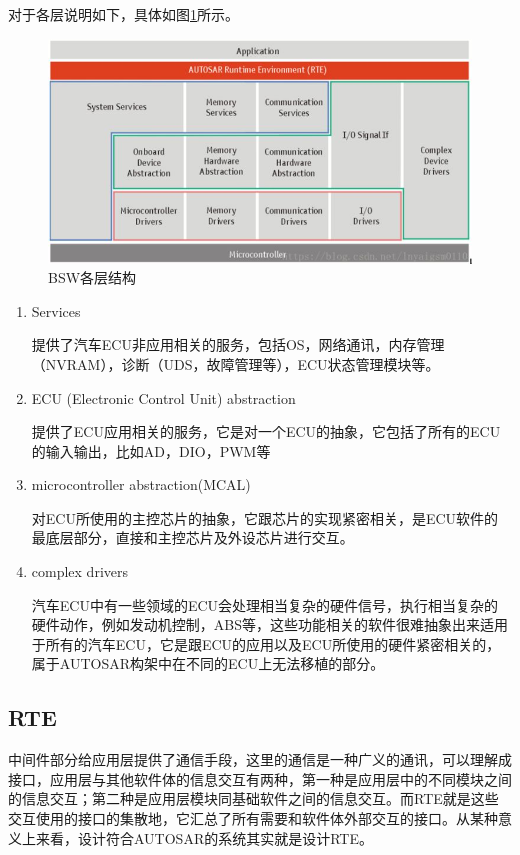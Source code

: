 对于各层说明如下，具体如图\ref{fig:bsw_struct_2}所示。
\begin{figure}[ht]
	\centering
	\includegraphics[scale=0.5]{pic/autosar_bsw_2.jpg}
	\caption{BSW各层结构}
	\label{fig:bsw_struct_2}
\end{figure}
\begin{enumerate}
	\item Services
	
	提供了汽车ECU非应用相关的服务，包括OS，网络通讯，内存管理（NVRAM），诊断（UDS，故障管理等），ECU状态管理模块等。
	\item ECU (Electronic Control Unit) abstraction
	
	提供了ECU应用相关的服务，它是对一个ECU的抽象，它包括了所有的ECU的输入输出，比如AD，DIO，PWM等
	\item microcontroller abstraction(MCAL)
	
	对ECU所使用的主控芯片的抽象，它跟芯片的实现紧密相关，是ECU软件的最底层部分，直接和主控芯片及外设芯片进行交互。
	\item complex drivers
	
	汽车ECU中有一些领域的ECU会处理相当复杂的硬件信号，执行相当复杂的硬件动作，例如发动机控制，ABS等，这些功能相关的软件很难抽象出来适用于所有的汽车ECU，它是跟ECU的应用以及ECU所使用的硬件紧密相关的，属于AUTOSAR构架中在不同的ECU上无法移植的部分。
\end{enumerate}

\subsection{RTE}
中间件部分给应用层提供了通信手段，这里的通信是一种广义的通讯，可以理解成接口，应用层与其他软件体的信息交互有两种，第一种是应用层中的不同模块之间的信息交互；第二种是应用层模块同基础软件之间的信息交互。而RTE就是这些交互使用的接口的集散地，它汇总了所有需要和软件体外部交互的接口。从某种意义上来看，设计符合AUTOSAR的系统其实就是设计RTE。

